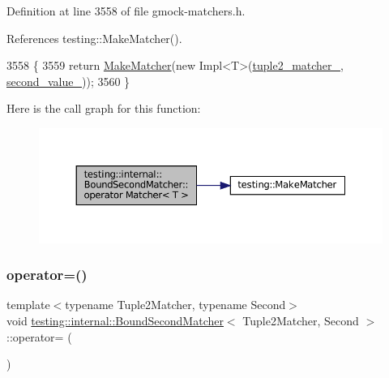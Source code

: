 Definition at line 3558 of file gmock-\/matchers.\+h.



References testing\+::\+Make\+Matcher().


\begin{DoxyCode}
3558                               \{
3559     \textcolor{keywordflow}{return} \hyperlink{namespacetesting_a37fd8029ac00e60952440a3d9cca8166}{MakeMatcher}(\textcolor{keyword}{new} Impl<T>(\hyperlink{classtesting_1_1internal_1_1BoundSecondMatcher_a4e73978cc5f6972a37b01832380f099e}{tuple2\_matcher\_}, 
      \hyperlink{classtesting_1_1internal_1_1BoundSecondMatcher_a5b0de81ac5ff6e7d9e21cb8bfeaacaf5}{second\_value\_}));
3560   \}
\end{DoxyCode}
Here is the call graph for this function\+:
\nopagebreak
\begin{figure}[H]
\begin{center}
\leavevmode
\includegraphics[width=350pt]{classtesting_1_1internal_1_1BoundSecondMatcher_abc5264ca86c2440b663036dcfb5403de_cgraph}
\end{center}
\end{figure}
\mbox{\label{classtesting_1_1internal_1_1BoundSecondMatcher_a62f714cb2c7388cb582aaae0110bfe49}} 
\subsubsection{\texorpdfstring{operator=()}{operator=()}}
{\footnotesize\ttfamily template$<$typename Tuple2\+Matcher, typename Second$>$ \\
void \hyperlink{classtesting_1_1internal_1_1BoundSecondMatcher}{testing\+::internal\+::\+Bound\+Second\+Matcher}$<$ Tuple2\+Matcher, Second $>$\+::operator= (\begin{DoxyParamCaption}\item[{const \hyperlink{classtesting_1_1internal_1_1BoundSecondMatcher}{Bound\+Second\+Matcher}$<$ Tuple2\+Matcher, Second $>$ \&}]{ }\end{DoxyParamCaption})\hspace{0.3cm}{\ttfamily [inline]}}



